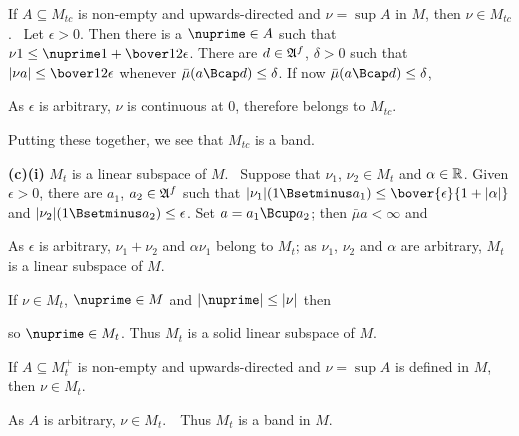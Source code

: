 { If $A\subseteq M_{tc}$ is non-empty and
upwards-directed and
$\nu=\sup A$ in $M$, then $\nu\in M_{tc}$.    \Prf\ Let $\epsilon>0$.
Then there is a $\nuprime\in A$ such that
$\nu 1\le\nuprime1+\bover12\epsilon$.
There are $d\in\frak A^f$, $\delta>0$ such that
$|\nu a|\le\bover12\epsilon$ whenever $\bar\mu(a\Bcap d)\le\delta$.
If now $\bar\mu(a\Bcap d)\le\delta$,


\noindent As $\epsilon$ is arbitrary, $\nu$ is continuous at $0$,
therefore belongs to $M_{tc}$.\ \Qed

Putting these together, we see that $M_{tc}$ is a band.

\medskip

{\bf (c)(i)} $M_t$ is a linear subspace of $M$.   \Prf\ Suppose that
$\nu_1$, $\nu_2\in M_t$ and $\alpha\in\Bbb R$.   Given $\epsilon>0$,
there are $a_1$, $a_2\in\frak A^f$ such that
$|\nu_1|(1\Bsetminus a_1)\le\bover{\epsilon}{1+|\alpha|}$
and $|\nu_2|(1\Bsetminus a_2)\le\epsilon$.   Set $a=a_1\Bcup a_2$;
then $\bar\mu a<\infty$ and


\noindent As $\epsilon$ is arbitrary, $\nu_1+\nu_2$ and $\alpha\nu_1$
belong to $M_t$;  as $\nu_1$, $\nu_2$ and $\alpha$ are arbitrary, $M_t$
is a linear subspace of $M$.\ \Qed

\medskip

 If $\nu\in M_t$, $\nuprime\in M$ and $|\nuprime|\le|\nu|$ then


\noindent so $\nuprime\in M_t$.    Thus $M_t$ is a solid linear subspace of
$M$.


\medskip

 If $A\subseteq M_t^+$ is non-empty and upwards-directed
and $\nu=\sup A$ is defined in $M$, then $\nu\in M_t$.   \Prf\


\noindent As $A$ is arbitrary, $\nu\in M_t$.\ \QeD\  Thus $M_t$ is a
band in $M$.
}%

